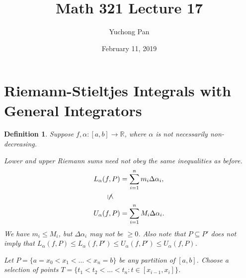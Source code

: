 \documentclass[letterpaper, reqno,11pt]{article}
\newcommand{\RR}{\mathbb{R}}
\begin{document}
\title{Math 321 Lecture 17}
\author{Yuchong Pan}
\date{February 11, 2019}
\newtheorem{thm}{Theorem}
\newtheorem{defn}{Definition}
\newtheorem*{remark}{Remark}
\newtheorem{claim}{Claim}
\newtheorem{cor}{Corollary}
\newtheorem{lemma}{Lemma}
\newtheorem{prop}{Proposition}
\maketitle
%

\section{Riemann-Stieltjes Integrals with General Integrators}

\begin{defn}
  \normalfont Suppose $f, \alpha : [a, b] \to \RR$, where $\alpha$ is not necessarily non-decreasing.

   Lower and upper Riemann sums need not obey the same inequalities as before.
  \begin{align*}
    L_\alpha (f, P) &= \sum_{i = 1}^n m_i \Delta \alpha_i, \\
    \centernot{\rotatebox[origin=c]{-90}{$\leq$}} \quad & \\
    U_\alpha (f, P) &= \sum_{i = 1}^n M_i \Delta \alpha_i.
  \end{align*}
  We have $m_i \leq M_i$, but $\Delta \alpha_i$ may not be $\geq 0$. Also note that $P \subseteq P'$ does not imply that $L_\alpha(f, P) \leq L_\alpha(f, P') \leq U_\alpha(f, P') \leq U_\alpha(f, P)$.

  Let $P = \{ a = x_0 < x_1 < \ldots < x_n = b \}$ be any partition of $[a, b]$. Choose a selection of points $T = \{ t_1 < t_2 < \ldots < t_n : t \in [x_{i - 1}, x_i] \}$.

  \begin{figure}[H]
    \centering
  \end{figure}


\end{defn}
\end{document}
